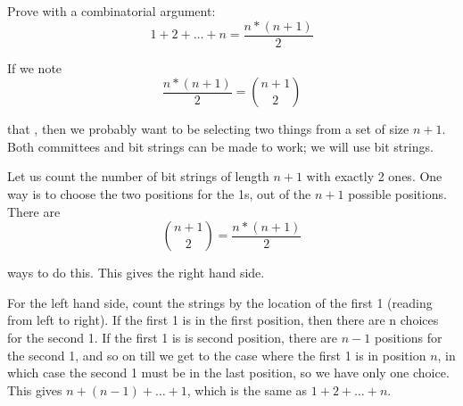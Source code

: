 \question Prove with a combinatorial argument: 
\[1 + 2 + \dotsc + n = \frac{n * (n + 1)}{2}\]
\begin{solution}
If we note 
\[\frac{n * (n + 1)}{2} = {n + 1 \choose 2}\]

that  , then we probably want to be selecting two things from a set of size $n + 1$. Both committees and bit strings can be made to work; we will use bit strings.\newline

Let us count the number of bit strings of length $n + 1$ with exactly 2 ones. One way is to choose the two positions for the 1s, out of the $n + 1$ possible positions. There are  
\[{n + 1 \choose 2} = \frac{n * (n + 1)}{2}\]

ways to do this. This gives the right hand side.\newline

For the left hand side, count the strings by the location of the first 1 (reading from left to right). If the first 1 is in the first position, then there are n choices for the second 1. If the first 1 is is second position, there are  $n − 1$ positions for the second 1, and so on till we get to the case where the first 1 is in position $n$, in which case the second 1 must be in the last position, so we have only one choice. This gives $n + (n - 1) + \dotsc + 1$, which is the same as $1 + 2 + \dotsc + n$.
\end{solution}